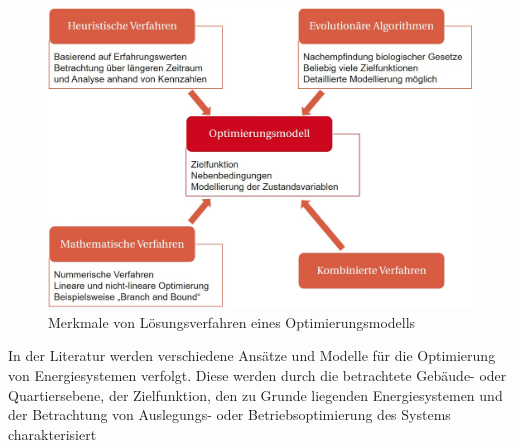 \begin{figure}[H]
	\centering
		\includegraphics{Pictures/Loesungsverfahren.jpg}
	\caption{Merkmale von Lösungsverfahren eines Optimierungsmodells \cite{Schellong.2016}}
	\label{fig: Abbildung311} 
\end{figure}

In der Literatur werden verschiedene Ansätze und Modelle für die Optimierung von Energiesystemen verfolgt.
Diese werden durch die betrachtete Gebäude- oder Quartiersebene, der Zielfunktion, den zu Grunde liegenden Energiesystemen und der Betrachtung von Auslegungs- oder Betriebsoptimierung des Systems charakterisiert

